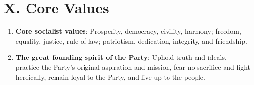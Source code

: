 \documentclass[11pt,a4paper]{ctexart}
\begin{document}
\section{X. Core Values}

\begin{enumerate}[leftmargin=2em]
    \item \textbf{Core socialist values}: Prosperity, democracy, civility, harmony; freedom, equality, justice, rule of law; patriotism, dedication, integrity, and friendship.
    \item \textbf{The great founding spirit of the Party}: Uphold truth and ideals, practice the Party's original aspiration and mission, fear no sacrifice and fight heroically, remain loyal to the Party, and live up to the people.
\end{enumerate}
\end{document}
